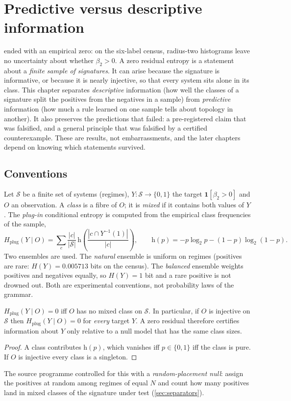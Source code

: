\chapter{Predictive versus descriptive information}\label{ch:predictive}

 ended with an empirical zero: on the six-label census, radius-two histograms leave no uncertainty about whether $\beta_2>0$. A zero residual entropy is a statement about a \emph{finite sample of signatures}. It can arise because the signature is informative, or because it is nearly injective, so that every system sits alone in its class. This chapter separates \emph{descriptive} information (how well the classes of a signature split the positives from the negatives in a sample) from \emph{predictive} information (how much a rule learned on one sample tells about topology in another). It also preserves the predictions that failed: a pre-registered claim that was falsified, and a general principle that was falsified by a certified counterexample. These are results, not embarrassments, and the later chapters depend on knowing which statements survived.

\section{Conventions}\label{sec:conv-info}
Let $\mathcal S$ be a finite set of systems (regimes), $Y:\mathcal S\to\{0,1\}$ the target $\mathbf 1[\beta_2>0]$ and $O$ an observation. A \emph{class} is a fibre of $O$; it is \emph{mixed} if it contains both values of $Y$. The \emph{plug-in} conditional entropy is computed from the empirical class frequencies of the sample,
\[
H_{\mathrm{plug}}(Y\mid O)=\sum_{c}\frac{|c|}{|\mathcal S|}\,\mathrm h\!\left(\frac{|c\cap Y^{-1}(1)|}{|c|}\right),\qquad \mathrm h(p)=-p\log_2p-(1-p)\log_2(1-p).
\]
Two ensembles are used. The \emph{natural} ensemble is uniform on regimes (positives are rare: $H(Y)=0.005713$ bits on the census). The \emph{balanced} ensemble weights positives and negatives equally, so $H(Y)=1$ bit and a rare positive is not drowned out. Both are experimental conventions, not probability laws of the grammar.
\begin{lemma}\label{lem:zero-cheap}
$H_{\mathrm{plug}}(Y\mid O)=0$ iff $O$ has no mixed class on $\mathcal S$. In particular, if $O$ is injective on $\mathcal S$ then $H_{\mathrm{plug}}(Y\mid O)=0$ for \emph{every} target $Y$. A zero residual therefore certifies information about $Y$ only relative to a null model that has the same class sizes.
\end{lemma}
\begin{proof}
A class contributes $\mathrm h(p)$, which vanishes iff $p\in\{0,1\}$ iff the class is pure. If $O$ is injective every class is a singleton.
\end{proof}
The source programme controlled for this with a \emph{random-placement null}: assign the positives at random among regimes of equal $N$ and count how many positives land in mixed classes of the signature under test (\cref{sec:separators}).

